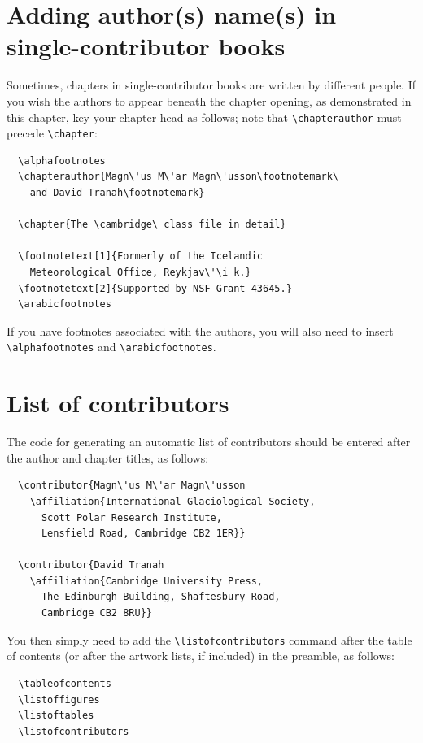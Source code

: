 \section{Adding author(s) name(s) in single-contributor books}
Sometimes, chapters in single-contributor books are written by different people. If you wish the authors to appear beneath the chapter opening, as demonstrated in this chapter, key your chapter head as follows; note that \verb"\chapterauthor" must precede \verb"\chapter":
\begin{verbatim}
  \alphafootnotes
  \chapterauthor{Magn\'us M\'ar Magn\'usson\footnotemark\
    and David Tranah\footnotemark}

  \chapter{The \cambridge\ class file in detail}

  \footnotetext[1]{Formerly of the Icelandic
    Meteorological Office, Reykjav\'\i k.}
  \footnotetext[2]{Supported by NSF Grant 43645.}
  \arabicfootnotes
\end{verbatim}
If you have footnotes associated with the authors, you will also need to insert \verb"\alphafootnotes" and \verb"\arabicfootnotes".

\section{List of contributors}
\label{contrib}
The code for generating an automatic list of contributors should be entered after the author and chapter titles, as follows:
\begin{verbatim}
  \contributor{Magn\'us M\'ar Magn\'usson
    \affiliation{International Glaciological Society,
      Scott Polar Research Institute,
      Lensfield Road, Cambridge CB2 1ER}}

  \contributor{David Tranah
    \affiliation{Cambridge University Press,
      The Edinburgh Building, Shaftesbury Road,
      Cambridge CB2 8RU}}
\end{verbatim}
You then simply need to add the \verb"\listofcontributors" command after the table of contents (or after the artwork lists, if included) in the preamble, as follows:
\begin{verbatim}
  \tableofcontents
  \listoffigures
  \listoftables
  \listofcontributors
\end{verbatim}


